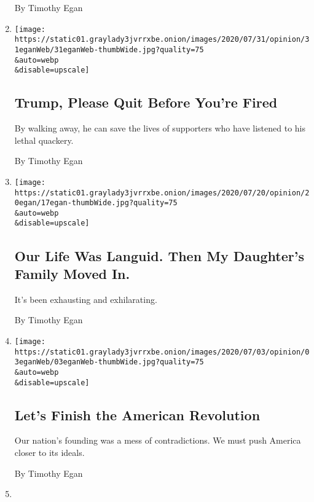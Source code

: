 \begin{enumerate}
  By Timothy Egan
\item
  \href{/2020/07/31/opinion/trump-resign.html}{}

  \texttt{[image: https://static01.graylady3jvrrxbe.onion/images/2020/07/31/opinion/31eganWeb/31eganWeb-thumbWide.jpg?quality=75\\\&auto=webp\\\&disable=upscale]}

  \hypertarget{trump-please-quit-before-youre-fired}{%
  \subsection{Trump, Please Quit Before You're
  Fired}\label{trump-please-quit-before-youre-fired}}

  By walking away, he can save the lives of supporters who have listened
  to his lethal quackery.

  By Timothy Egan
\item
  \href{/2020/07/17/opinion/coronavirus-family.html}{}

  \texttt{[image: https://static01.graylady3jvrrxbe.onion/images/2020/07/20/opinion/20egan/17egan-thumbWide.jpg?quality=75\\\&auto=webp\\\&disable=upscale]}

  \hypertarget{our-life-was-languid-then-my-daughters-family-moved-in}{%
  \subsection{Our Life Was Languid. Then My Daughter's Family Moved
  In.}\label{our-life-was-languid-then-my-daughters-family-moved-in}}

  It's been exhausting and exhilarating.

  By Timothy Egan
\item
  \href{/2020/07/03/opinion/fourth-of-july.html}{}

  \texttt{[image: https://static01.graylady3jvrrxbe.onion/images/2020/07/03/opinion/03eganWeb/03eganWeb-thumbWide.jpg?quality=75\\\&auto=webp\\\&disable=upscale]}

  \hypertarget{lets-finish-the-american-revolution}{%
  \subsection{Let's Finish the American
  Revolution}\label{lets-finish-the-american-revolution}}

  Our nation's founding was a mess of contradictions. We must push
  America closer to its ideals.

  By Timothy Egan
\item
  \href{/2020/06/19/opinion/trump-jr.html}{}


\end{enumerate}
